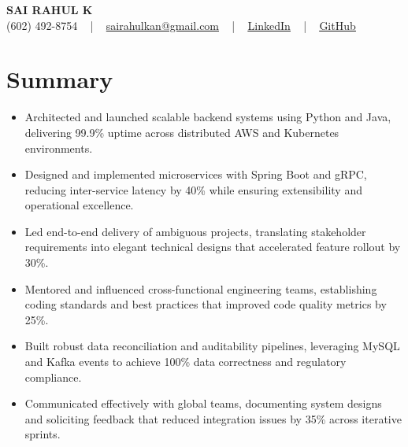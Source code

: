 \documentclass[letterpaper,11pt]{article}
\newcommand{\resumeItem}[1]{
  \item\footnotesize{
    {#1 \vspace{-2pt}}
  }
}
\newcommand{\resumeItemListStart}{\begin{itemize}[leftmargin=*]}
\newcommand{\resumeItemListEnd}{\end{itemize}\vspace{-5pt}}
\begin{document}
\begin{center}
    {\fontsize{14pt}{12pt}\selectfont \textbf{\MakeUppercase{Sai Rahul K}}}\\ \vspace{2pt}
    \fontsize{10pt}{12pt}\selectfont (602) 492-8754 ~ | ~ \href{mailto:sairahulkan@gmail.com}{sairahulkan@gmail.com} ~ | ~
    \href{https://www.linkedin.com/in/rq123/}{\color{blue}\underline{LinkedIn}} ~ | ~
    \href{https://github.com/kanrahuldo}{\color{blue}\underline{GitHub}}~
    \vspace{-8pt}
\end{center}

\section{Summary}
\resumeItemListStart
    \resumeItem{Architected and launched scalable backend systems using Python and Java, delivering 99.9\% uptime across distributed AWS and Kubernetes environments.}
    \resumeItem{Designed and implemented microservices with Spring Boot and gRPC, reducing inter-service latency by 40\% while ensuring extensibility and operational excellence.}
    \resumeItem{Led end-to-end delivery of ambiguous projects, translating stakeholder requirements into elegant technical designs that accelerated feature rollout by 30\%.}
    \resumeItem{Mentored and influenced cross-functional engineering teams, establishing coding standards and best practices that improved code quality metrics by 25\%.}
    \resumeItem{Built robust data reconciliation and auditability pipelines, leveraging MySQL and Kafka events to achieve 100\% data correctness and regulatory compliance.}
    \resumeItem{Communicated effectively with global teams, documenting system designs and soliciting feedback that reduced integration issues by 35\% across iterative sprints.}
\resumeItemListEnd
\end{document}
